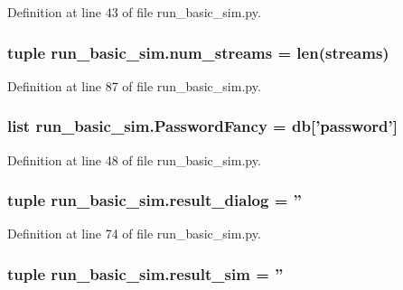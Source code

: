 Definition at line 43 of file run\-\_\-basic\-\_\-sim.\-py.

\hypertarget{namespacerun__basic__sim_a6e233ceb12c89f47c3f5d46fbe0a97c0}{
\subsubsection[{num\-\_\-streams}]{\setlength{\rightskip}{0pt plus 5cm}tuple run\-\_\-basic\-\_\-sim.\-num\-\_\-streams = len({\bf streams})}}\label{namespacerun__basic__sim_a6e233ceb12c89f47c3f5d46fbe0a97c0}


Definition at line 87 of file run\-\_\-basic\-\_\-sim.\-py.

\hypertarget{namespacerun__basic__sim_adfaf4423db91486ada36676529e1dc5d}{
\subsubsection[{Password\-Fancy}]{\setlength{\rightskip}{0pt plus 5cm}list run\-\_\-basic\-\_\-sim.\-Password\-Fancy = {\bf db}\mbox{[}'password'\mbox{]}}}\label{namespacerun__basic__sim_adfaf4423db91486ada36676529e1dc5d}


Definition at line 48 of file run\-\_\-basic\-\_\-sim.\-py.

\hypertarget{namespacerun__basic__sim_a826e82f3f93e021f977571ad2f1aa79f}{
\subsubsection[{result\-\_\-dialog}]{\setlength{\rightskip}{0pt plus 5cm}tuple run\-\_\-basic\-\_\-sim.\-result\-\_\-dialog = ''}}\label{namespacerun__basic__sim_a826e82f3f93e021f977571ad2f1aa79f}


Definition at line 74 of file run\-\_\-basic\-\_\-sim.\-py.

\hypertarget{namespacerun__basic__sim_ab3077fbde3dc20f73989559c65d85746}{
\subsubsection[{result\-\_\-sim}]{\setlength{\rightskip}{0pt plus 5cm}tuple run\-\_\-basic\-\_\-sim.\-result\-\_\-sim = ''}}\label{namespacerun__basic__sim_ab3077fbde3dc20f73989559c65d85746}


